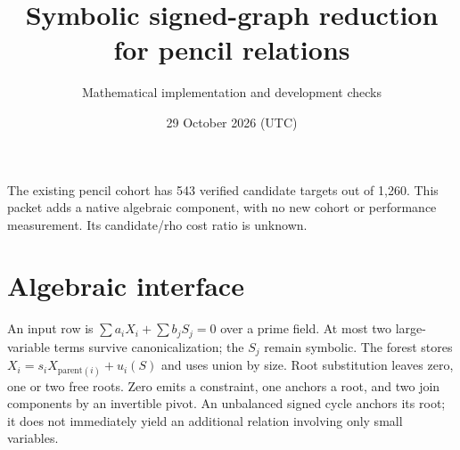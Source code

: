 \documentclass[11pt]{article}
\title{Symbolic signed-graph reduction for pencil relations}
\author{Mathematical implementation and development checks}
\date{29 October 2026 (UTC)}
\begin{document}
\maketitle
\noindent The existing pencil cohort has 543 verified candidate targets out of
1,260. This packet adds a native algebraic component, with no new cohort or
performance measurement. Its candidate/rho cost ratio is unknown.
\section*{Algebraic interface}
An input row is $\sum a_iX_i+\sum b_jS_j=0$ over a prime field. At most two
large-variable terms survive canonicalization; the $S_j$ remain symbolic.
The forest stores $X_i=s_iX_{\mathrm{parent}(i)}+u_i(S)$ and uses union by size.
Root substitution leaves zero, one or two free roots. Zero emits a constraint,
one anchors a root, and two join components by an invertible pivot.
An unbalanced signed cycle anchors its root; it does not immediately yield
an additional relation involving only small variables.
\end{document}
